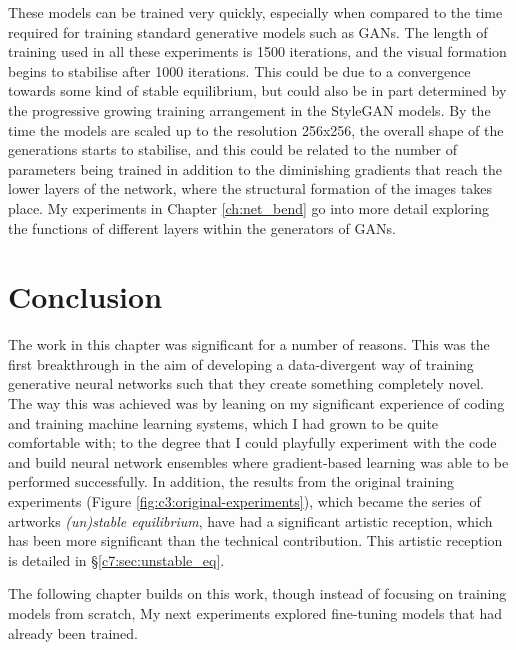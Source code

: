 These models can be trained very quickly, especially when compared to the time required for training standard generative models such as GANs.
The length of training used in all these experiments is 1500 iterations, and the visual formation begins to stabilise after 1000 iterations.
This could be due to a convergence towards some kind of stable equilibrium, but could also be in part determined by the progressive growing training arrangement in the StyleGAN models. 
By the time the models are scaled up to the resolution 256x256, the overall shape of the generations starts to stabilise, and this could be related to the number of parameters being trained  in addition to the diminishing gradients that reach the lower layers of the network, where the structural formation of the images takes place.
My experiments in Chapter \ref{ch:net_bend} go into more detail exploring the functions of different layers within the generators of GANs. 


\section{Conclusion}

The work in this chapter was significant for a number of reasons. 
This was the first breakthrough in the aim of developing a data-divergent way of training generative neural networks such that they create something completely novel. 
The way this was achieved was by leaning on my significant experience of coding and training machine learning systems, which I had grown to be quite comfortable with; to the degree that I could playfully experiment with the code and build neural network ensembles where gradient-based learning was able to be performed successfully.
In addition, the results from the original training experiments (Figure \ref{fig:c3:original-experiments}), which became the series of artworks \textit{(un)stable equilibrium}, have had a significant artistic reception, which has been more significant than the technical contribution.
This artistic reception is detailed in \S \ref{c7:sec:unstable_eq}.

The following chapter builds on this work, though instead of focusing on training models from scratch, 
My next experiments explored fine-tuning models that had already been trained.
